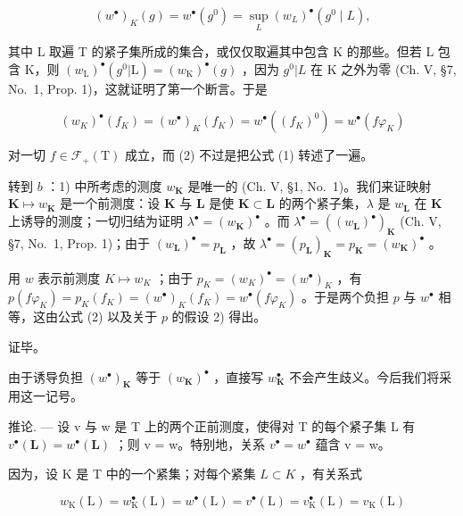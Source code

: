 \[
(w ^ {\bullet}) _ {K} (g) = w ^ {\bullet} \left(g ^ {0}\right) = \sup _ {L} \left(w _ {L}\right) ^ {\bullet} \left(g ^ {0} \mid L\right),
\]

其中 L 取遍 T 的紧子集所成的集合，或仅仅取遍其中包含 K 的那些。但若 L 包含 K，则 \((w_{\mathrm{L}})^{\bullet}(g^{0}|\mathrm{L})=(w_{\mathrm{K}})^{\bullet}(g)\) ，因为 \(g^{0}|L\) 在 K 之外为零 (Ch. V, §7, No.~1, Prop. 1)，这就证明了第一个断言。于是

\[
(w _ {K}) ^ {\bullet} (f _ {K}) = (w ^ {\bullet}) _ {K} (f _ {K}) = w ^ {\bullet} \left((f _ {K}) ^ {0}\right) = w ^ {\bullet} (f \varphi_ {K})
\]

对一切 \(f \in \mathcal{F}_{+}(\mathrm{T})\) 成立，而 (2) 不过是把公式 (1) 转述了一遍。

转到 \(b\) ：1) 中所考虑的测度 \(w_{\mathbf{K}}\) 是唯一的 (Ch. V, §1, No.~1)。我们来证映射 \(\mathbf{K} \mapsto w_{\mathbf{K}}\) 是一个前测度：设 \(\mathbf{K}\) 与 \(\mathbf{L}\) 是使 \(\mathbf{K} \subset \mathbf{L}\) 的两个紧子集，\(\lambda\) 是 \(w_{\mathbf{L}}\) 在 \(\mathbf{K}\) 上诱导的测度；一切归结为证明 \(\lambda^{\bullet} = (w_{\mathbf{K}})^{\bullet}\) 。而 \(\lambda^{\bullet} = ((w_{\mathbf{L}})^{\bullet})_{\mathbf{K}}\) (Ch. V, §7, No.~1, Prop. 1)；由于 \((w_{\mathbf{L}})^{\bullet} = p_{\mathbf{L}}\) ，故 \(\lambda^{\bullet} = (p_{\mathbf{L}})_{\mathbf{K}} = p_{\mathbf{K}} = (w_{\mathbf{K}})^{\bullet}\) 。

用 \(w\) 表示前测度 \(K \mapsto w_K\) ；由于 \(p_K = (w_K)^{\bullet} = (w^{\bullet})_K\) ，有 \(p(f\varphi_K) = p_K(f_K) = (w^{\bullet})_K(f_K) = w^{\bullet}(f\varphi_K)\) 。于是两个负担 \(p\) 与 \(w^{\bullet}\) 相等，这由公式 (2) 以及关于 \(p\) 的假设 2) 得出。

证毕。

由于诱导负担 \((w^{\bullet})_{\mathbf{K}}\) 等于 \((w_{\mathbf{K}})^{\bullet}\) ，直接写 \(w_{\mathbf{K}}^{\bullet}\) 不会产生歧义。今后我们将采用这一记号。

推论. --- 设 v 与 w 是 T 上的两个正前测度，使得对 T 的每个紧子集 L 有 \(v^{\bullet}(\mathbf{L}) = w^{\bullet}(\mathbf{L})\) ；则 v = w。特别地，关系 \(v^{\bullet} = w^{\bullet}\) 蕴含 v = w。

因为，设 K 是 T 中的一个紧集；对每个紧集 \(L \subset K\) ，有关系式

\[
w _ {\mathrm{K}} (\mathrm{L}) = w _ {\mathrm{K}} ^ {\bullet} (\mathrm{L}) = w ^ {\bullet} (\mathrm{L}) = v ^ {\bullet} (\mathrm{L}) = v _ {\mathrm{K}} ^ {\bullet} (\mathrm{L}) = v _ {\mathrm{K}} (\mathrm{L})
\]

